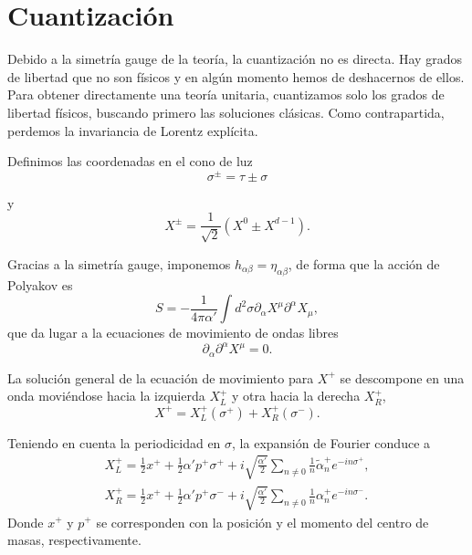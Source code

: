 

\section{Cuantización}

Debido a la simetría gauge de la teoría, la cuantización no es directa.
Hay grados de libertad que no son físicos y en algún momento hemos de deshacernos de ellos.
Para obtener directamente una teoría unitaria, cuantizamos solo los grados de libertad 
físicos, buscando primero las soluciones clásicas. 
Como contrapartida, perdemos la invariancia de Lorentz explícita.

Definimos las coordenadas en el cono de luz
\begin{equation}
  \sigma^\pm=\tau\pm\sigma
\end{equation}

y
\begin{equation}
  X^\pm=\frac{1}{\sqrt 2} (X^0 \pm X^{d-1}).
\end{equation}

Gracias a la simetría gauge, imponemos $h_{\alpha\beta}=\eta_{\alpha\beta}$, de forma que 
la acción de Polyakov es
\begin{equation}
  S = -\frac{1}{4\pi\alpha'} \int d^2\sigma \partial_\alpha X^\mu \partial^\alpha X_\mu,
\end{equation}
que da lugar a la ecuaciones de movimiento de ondas libres
\begin{equation}
  \partial_\alpha \partial^\alpha X^\mu=0.
\end{equation}

La solución general de la ecuación de movimiento para $X^+$ se descompone
en una onda moviéndose hacia la izquierda $X^+_L$ y otra hacia la derecha $X^+_R$,
\begin{equation}
   X^+ =X^+_L(\sigma^+) + X^+_R(\sigma^-).
\end{equation}

Teniendo en cuenta la periodicidad en $\sigma$, la expansión de Fourier conduce a
\begin{equation}
  \begin{gathered}
    X^+_L=\frac 1 2 x^+ + \frac 1 2 \alpha' p^+ \sigma^+ + i\sqrt{\frac{\alpha'}{2}}\sum_{n\neq 0} \frac{1}{n}\tilde \alpha^+_n e^{-in\sigma^+},\\
    X^+_R=\frac 1 2 x^+ + \frac 1 2 \alpha' p^+ \sigma^- +i\sqrt{\frac{\alpha'}{2}}\sum_{n\neq 0} \frac{1}{n}\alpha^+_n e^{-in\sigma^-}.
  \end{gathered}
\end{equation}
Donde $x^+$ y $p^+$ se corresponden con la posición y el momento del centro de masas, respectivamente.


